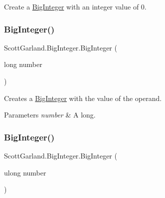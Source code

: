 Create a \hyperlink{class_scott_garland_1_1_big_integer}{Big\+Integer} with an integer value of 0. 

\mbox{\label{class_scott_garland_1_1_big_integer_a814a50a2d47afab9a43e74204a53fcf0}} 
\subsubsection{\texorpdfstring{Big\+Integer()}{BigInteger()}\hspace{0.1cm}{\footnotesize\ttfamily [2/8]}}
{\footnotesize\ttfamily Scott\+Garland.\+Big\+Integer.\+Big\+Integer (\begin{DoxyParamCaption}\item[{long}]{number }\end{DoxyParamCaption})\hspace{0.3cm}{\ttfamily [inline]}}



Creates a \hyperlink{class_scott_garland_1_1_big_integer}{Big\+Integer} with the value of the operand. 


\begin{DoxyParams}{Parameters}
{\em number} & A long.\\
\hline
\end{DoxyParams}
\mbox{\label{class_scott_garland_1_1_big_integer_a0ff4d1469a5c9cdb39cc6bdd0ec995b2}} 
\subsubsection{\texorpdfstring{Big\+Integer()}{BigInteger()}\hspace{0.1cm}{\footnotesize\ttfamily [3/8]}}
{\footnotesize\ttfamily Scott\+Garland.\+Big\+Integer.\+Big\+Integer (\begin{DoxyParamCaption}\item[{ulong}]{number }\end{DoxyParamCaption})\hspace{0.3cm}{\ttfamily [inline]}}



